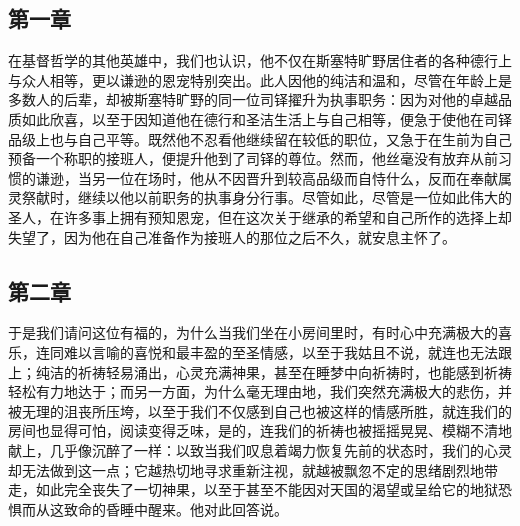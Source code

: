 
\subsection{第一章}

\par

在基督哲学的其他英雄中，我们也认识，他不仅在斯塞特旷野居住者的各种德行上与众人相等，更以谦逊的恩宠特别突出。此人因他的纯洁和温和，尽管在年龄上是多数人的后辈，却被斯塞特旷野的同一位司铎擢升为执事职务：因为对他的卓越品质如此欣喜，以至于因知道他在德行和圣洁生活上与自己相等，便急于使他在司铎品级上也与自己平等。既然他不忍看他继续留在较低的职位，又急于在生前为自己预备一个称职的接班人，便提升他到了司铎的尊位。然而，他丝毫没有放弃从前习惯的谦逊，当另一位在场时，他从不因晋升到较高品级而自恃什么，反而在奉献属灵祭献时，继续以他以前职务的执事身分行事。尽管如此，尽管是一位如此伟大的圣人，在许多事上拥有预知恩宠，但在这次关于继承的希望和自己所作的选择上却失望了，因为他在自己准备作为接班人的那位之后不久，就安息主怀了。\par


\subsection{第二章}

\par

于是我们请问这位有福的，为什么当我们坐在小房间里时，有时心中充满极大的喜乐，连同难以言喻的喜悦和最丰盈的至圣情感，以至于我姑且不说，就连也无法跟上；纯洁的祈祷轻易涌出，心灵充满神果，甚至在睡梦中向祈祷时，也能感到祈祷轻松有力地达于；而另一方面，为什么毫无理由地，我们突然充满极大的悲伤，并被无理的沮丧所压垮，以至于我们不仅感到自己也被这样的情感所胜，就连我们的房间也显得可怕，阅读变得乏味，是的，连我们的祈祷也被摇摇晃晃、模糊不清地献上，几乎像沉醉了一样：以致当我们叹息着竭力恢复先前的状态时，我们的心灵却无法做到这一点；它越热切地寻求重新注视，就越被飘忽不定的思绪剧烈地带走，如此完全丧失了一切神果，以至于甚至不能因对天国的渴望或呈给它的地狱恐惧而从这致命的昏睡中醒来。他对此回答说。\par

